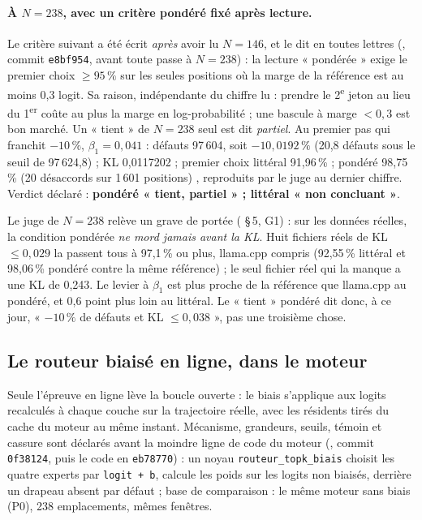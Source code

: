 \paragraph{À $N = 238$, avec un critère pondéré fixé après lecture.} Le critère suivant a été écrit \emph{après} avoir lu $N = 146$, et le dit en toutes lettres (, commit \texttt{e8bf954}, avant toute passe à $N = 238$) : la lecture « pondérée » exige le premier choix $\ge 95\,\%$ sur les seules positions où la marge de la référence est au moins 0,3 logit. Sa raison, indépendante du chiffre lu : prendre le 2\textsuperscript{e} jeton au lieu du 1\textsuperscript{er} coûte au plus la marge en log-probabilité ; une bascule à marge $< 0{,}3$ est bon marché. Un « tient » de $N = 238$ seul est dit \emph{partiel}. Au premier pas qui franchit $-10\,\%$, $\beta_1 = 0{,}041$ : défauts 97\,604, soit $-10{,}0192\,\%$ (20,8 défauts sous le seuil de 97\,624,8) ; KL 0,0117202 ; premier choix littéral 91,96\,\% ; pondéré 98,75\,\% (20 désaccords sur 1\,601 positions) \mes, reproduits par le juge au dernier chiffre. Verdict déclaré : \textbf{pondéré « tient, partiel » ; littéral « non concluant »}.

Le juge de $N = 238$ relève un grave de portée ( §\,5, G1) : sur les données réelles, la condition pondérée \emph{ne mord jamais avant la KL}. Huit fichiers réels de KL $\le 0{,}029$ la passent tous à 97,1\,\% ou plus, llama.cpp compris (92,55\,\% littéral et 98,06\,\% pondéré contre la même référence) ; le seul fichier réel qui la manque a une KL de 0,243. Le levier à $\beta_1$ est plus proche de la référence que llama.cpp au pondéré, et 0,6 point plus loin au littéral. Le « tient » pondéré dit donc, à ce jour, « $-10\,\%$ de défauts et KL $\le 0{,}038$ », pas une troisième chose.

\subsection{Le routeur biaisé en ligne, dans le moteur}\label{t3mim:sec:p3-ligne}

Seule l'épreuve en ligne lève la boucle ouverte : le biais s'applique aux logits recalculés à chaque couche sur la trajectoire réelle, avec les résidents tirés du cache du moteur au même instant. Mécanisme, grandeurs, seuils, témoin et cassure sont déclarés avant la moindre ligne de code du moteur (, commit \texttt{0f38124}, puis le code en \texttt{eb78770}) : un noyau \texttt{routeur\_topk\_biais} choisit les quatre experts par \texttt{logit + b}, calcule les poids sur les logits non biaisés, derrière un drapeau absent par défaut ; base de comparaison : le même moteur sans biais (P0), 238 emplacements, mêmes fenêtres.

